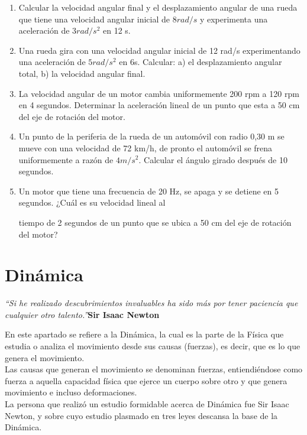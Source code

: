 \documentclass[a5paper,pagesize,10pt,bibtotoc,pointlessnumbers,
normalheadings,DIV=9,fleqn,x11names,table,twoside=false]{scrbook}
\begin{document}
\begin{enumerate}
\item Calcular la  velocidad  angular  final  y  el desplazamiento  angular de  una  rueda  que  tiene una velocidad angular 
inicial de $8 rad/s$ y experimenta una aceleración de $3 rad/s^2$ en 12 s.

\item Una  rueda  gira  con  una  velocidad  angular inicial  de  12  rad/s  experimentando  una  aceleración de $5 rad/s^2$ en 
6s. Calcular: a) el desplazamiento angular total, b) la velocidad angular final.

\item La velocidad angular de un motor cambia uniformemente 200 rpm a 120 rpm en 4 segundos. Determinar la aceleración lineal de 
un punto que esta a 50 cm del eje de rotación del motor.

\item Un punto de la periferia de la rueda de un automóvil con radio 0,30 m  se mueve con una velocidad de 72 km/h, de pronto el 
automóvil se frena uniformemente a razón de $4 m/s^2$.  Calcular  el ángulo girado  después de 10 segundos.

\item  Un motor que tiene 
una frecuencia de 20 Hz, se apaga y se detiene en 5 segundos. ¿Cuál es su velocidad lineal al 

tiempo de 2 segundos de un punto que se ubica a 50 cm del eje de rotación del motor?

\end{enumerate}


\chapter{Dinámica}

\textit{``Si he realizado descubrimientos invaluables ha sido más por tener paciencia que cualquier otro talento.''}\textbf{Sir 
Isaac Newton}
\vspace{1.0cm}

En este apartado se refiere a la Dinámica, la cual es la parte de la Física que estudia o analiza el movimiento desde sus causas 
(fuerzas), es decir, que es lo que genera el movimiento.\\

Las causas que generan el movimiento se denominan fuerzas, entiendiéndose como fuerza a aquella capacidad física que ejerce un 
cuerpo sobre otro y que genera movimiento e incluso deformaciones.\\

La persona que realizó un estudio formidable acerca de Dinámica fue Sir Isaac Newton, y sobre cuyo estudio plasmado en tres leyes 
descansa la base de la Dinámica.
 
\end{document}
